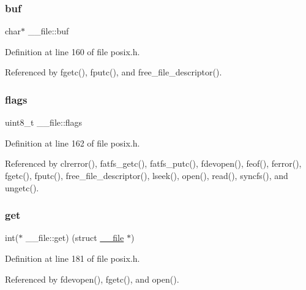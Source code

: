 \subsubsection{\texorpdfstring{buf}{buf}}
{\footnotesize\ttfamily char$\ast$ \+\_\+\+\_\+file\+::buf}



Definition at line 160 of file posix.\+h.



Referenced by fgetc(), fputc(), and free\+\_\+file\+\_\+descriptor().

\mbox{\label{struct____file_a8d11df8679502efee09740f97d7c277b}} 
\subsubsection{\texorpdfstring{flags}{flags}}
{\footnotesize\ttfamily uint8\+\_\+t \+\_\+\+\_\+file\+::flags}



Definition at line 162 of file posix.\+h.



Referenced by clrerror(), fatfs\+\_\+getc(), fatfs\+\_\+putc(), fdevopen(), feof(), ferror(), fgetc(), fputc(), free\+\_\+file\+\_\+descriptor(), lseek(), open(), read(), syncfs(), and ungetc().

\mbox{\label{struct____file_a2d816b077c3af0425344fe4b283dad33}} 
\subsubsection{\texorpdfstring{get}{get}}
{\footnotesize\ttfamily int($\ast$ \+\_\+\+\_\+file\+::get) (struct \hyperlink{struct____file}{\+\_\+\+\_\+file} $\ast$)}



Definition at line 181 of file posix.\+h.



Referenced by fdevopen(), fgetc(), and open().

\mbox{\label{struct____file_a30309efd13a75ed510bb2370debafaf8}} 
